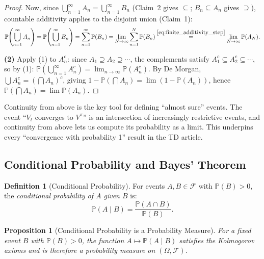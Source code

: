 \documentclass[11pt,a4paper]{article}
\theoremstyle{definition}
\newtheorem{definition}{Definition}[section]
\theoremstyle{plain}
\newtheorem{proposition}[theorem]{Proposition}
\theoremstyle{remark}
\newcommand{\Prob}{\mathbb{P}}
\begin{document}
\begin{proof}
\medskip
Now, since $\bigcup_{n=1}^\infty A_n = \bigcup_{n=1}^\infty B_n$ (Claim~2 gives $\subseteq$; $B_n \subseteq A_n$ gives $\supseteq$), countable additivity applies to the disjoint union (Claim~1):
\begin{equation}
    \Prob\!\left(\bigcup_{n=1}^\infty A_n\right) = \Prob\!\left(\bigcup_{n=1}^\infty B_n\right) = \sum_{n=1}^\infty \Prob(B_n) = \lim_{N \to \infty} \sum_{n=1}^N \Prob(B_n) \overset{\eqref{eq:finite_additivity_step}}{=} \lim_{N \to \infty} \Prob(A_N).
\end{equation}

\textbf{(2)} Apply (1) to $A_n^c$: since $A_1 \supseteq A_2 \supseteq \cdots$, the complements satisfy $A_1^c \subseteq A_2^c \subseteq \cdots$, so by (1): $\Prob(\bigcup_{n=1}^\infty A_n^c) = \lim_{n \to \infty} \Prob(A_n^c)$. By De Morgan, $\bigcup A_n^c = (\bigcap A_n)^c$, giving $1 - \Prob(\bigcap A_n) = \lim(1 - \Prob(A_n))$, hence $\Prob(\bigcap A_n) = \lim \Prob(A_n)$.
\end{proof}

\begin{rlconnection}[Connection to RL]
Continuity from above is the key tool for defining ``almost sure'' events. The event ``$V_t$ converges to $V^\pi$'' is an intersection of increasingly restrictive events, and continuity from above lets us compute its probability as a limit. This underpins every ``convergence with probability 1'' result in the TD article.
\end{rlconnection}

\subsection{Conditional Probability and Bayes' Theorem}
\label{subsec:cond_prob}

\begin{definition}[Conditional Probability]
\label{def:cond_prob}
For events $A, B \in \mathcal{F}$ with $\Prob(B) > 0$, the \emph{conditional probability of $A$ given $B$} is:
\begin{equation}
    \Prob(A \mid B) = \frac{\Prob(A \cap B)}{\Prob(B)}.
    \label{eq:cond_prob}
\end{equation}
\end{definition}

\begin{proposition}[Conditional Probability is a Probability Measure]
\label{prop:cond_is_prob}
For a fixed event $B$ with $\Prob(B) > 0$, the function $A \mapsto \Prob(A \mid B)$ satisfies the Kolmogorov axioms and is therefore a probability measure on $(\Omega, \mathcal{F})$.
\end{proposition}
\end{document}
